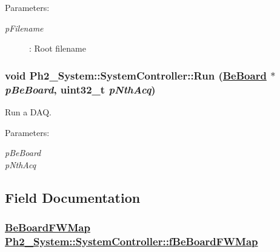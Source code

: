 \begin{Desc}
\item[Parameters:]
\begin{description}
\item[{\em p\-Filename}]: Root filename \end{description}
\end{Desc}
\hypertarget{class_ph2___system_1_1_system_controller_566a9fd32ddb038dc935de263a0032f8}{
\subsubsection[Run]{\setlength{\rightskip}{0pt plus 5cm}void Ph2\_\-System::System\-Controller::Run (\hyperlink{class_ph2___hw_description_1_1_be_board}{Be\-Board} $\ast$ {\em p\-Be\-Board}, uint32\_\-t {\em p\-Nth\-Acq})}}
\label{class_ph2___system_1_1_system_controller_566a9fd32ddb038dc935de263a0032f8}


Run a DAQ. 

\begin{Desc}
\item[Parameters:]
\begin{description}
\item[{\em p\-Be\-Board}]\item[{\em p\-Nth\-Acq}]\end{description}
\end{Desc}


\subsection{Field Documentation}
\hypertarget{class_ph2___system_1_1_system_controller_84042bff8bf08490a04e82bdeea9c7d6}{
\subsubsection[fBeBoardFWMap]{\setlength{\rightskip}{0pt plus 5cm}\hyperlink{namespace_ph2___hw_interface_59fe3165f25ded62b5b12cf0ebc69e8d}{Be\-Board\-FWMap} \hyperlink{class_ph2___system_1_1_system_controller_84042bff8bf08490a04e82bdeea9c7d6}{Ph2\_\-System::System\-Controller::f\-Be\-Board\-FWMap}}}
\label{class_ph2___system_1_1_system_controller_84042bff8bf08490a04e82bdeea9c7d6}


